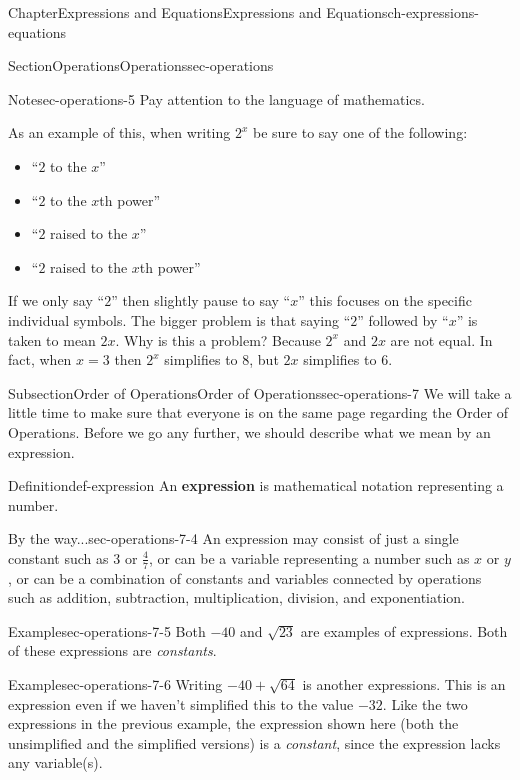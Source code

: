 \documentclass[twoside,11pt,]{book}
\newcommand{\terminology}[1]{\textbf{#1}}
\numberwithin{equation}{chapter}
\begin{document}
\begin{chapterptx}{Chapter}{Expressions and Equations}{}{Expressions and Equations}{}{}{ch-expressions-equations}
\begin{sectionptx}{Section}{Operations}{}{Operations}{}{}{sec-operations}
\begin{note}{Note}{}{sec-operations-5}%
Pay attention to the language of mathematics.%
\end{note}
As an example of this, when writing \(2^x\) be sure to say one of the following:%
\begin{itemize}[label=\textbullet]
\item{}``\(2\) to the \(x\)''%
\item{}``\(2\) to the \(x\)th power''%
\item{}``\(2\) raised to the \(x\)''%
\item{}``\(2\) raised to the \(x\)th power''%
\end{itemize}
If we only say ``\(2\)'' then slightly pause to say ``\(x\)'' this focuses on the specific individual symbols. The bigger problem is that saying ``\(2\)'' followed by ``\(x\)'' is taken to mean \(2x\). Why is this a problem? Because \(2^x\) and \(2x\) are not equal. In fact, when \(x=3\) then \(2^x\) simplifies to \(8\), but \(2x\) simplifies to \(6\).%
%
%
\typeout{************************************************}
\typeout{************************************************}
%
\begin{subsectionptx}{Subsection}{Order of Operations}{}{Order of Operations}{}{}{sec-operations-7}
We will take a little time to make sure that everyone is on the same page regarding the Order of Operations. Before we go any further, we should describe what we mean by an expression.%
\begin{definition}{Definition}{}{def-expression}%
An \terminology{expression} is mathematical notation representing a number.%
\end{definition}
\begin{aside}{By the way...}{}{sec-operations-7-4}%
An expression may consist of just a single constant such as \(3\) or \(\frac{4}{7}\), or can be a variable representing a number such as \(x\) or \(y\), or can be a combination of constants and variables connected by operations such as addition, subtraction, multiplication, division, and exponentiation.%
\end{aside}
\begin{example}{Example}{}{sec-operations-7-5}%
Both \(-40\) and \(\sqrt{23}\) are examples of expressions. Both of these expressions are \emph{constants}.%
\end{example}
\begin{example}{Example}{}{sec-operations-7-6}%
Writing \(-40+\sqrt{64}\) is another expressions. This is an expression even if we haven't simplified this to the value \(-32\). Like the two expressions in the previous example, the expression shown here (both the unsimplified and the simplified versions) is a \emph{constant}, since the expression lacks any variable(s).%

\end{example}
\end{subsectionptx}
\end{sectionptx}
\end{chapterptx}
\end{document}
